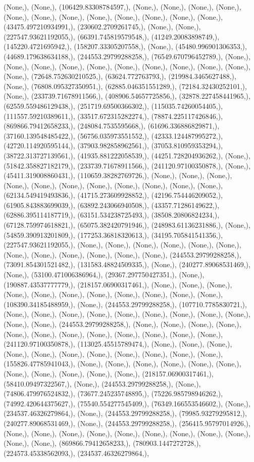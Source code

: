 \documentclass{article}
\begin{document}
(None,), (None,), (106429.83308784597,), (None,), (None,), (None,), (None,), (None,), (None,), (None,), (None,), (None,), (None,), (None,), (None,), (43475.497210934991,), (230602.2709261745,), (None,), (None,), (227547.93621192055,), (66391.745819579548,), (41249.20083898749,), (145220.4721695942,), (158207.33305207558,), (None,), (45480.996901306353,), (44689.179638634188,), (244553.29799288258,), (76549.670796452789,), (None,), (None,), (None,), (None,), (None,), (None,), (None,), (None,), (None,), (None,), (None,), (72648.752630210525,), (63624.772763793,), (219984.3465627488,), (None,), (76808.095327350951,), (62885.046351551289,), (72184.32430252101,), (None,), (233739.71678911566,), (408906.54657725856,), (32878.227458441965,), (62559.559486129438,), (251719.69500366302,), (115035.74260054405,), (111557.59210389611,), (33517.672315282274,), (78874.225117426846,), (869866.79412658233,), (248084.7535595668,), (61696.336886829871,), (37160.139548485422,), (56756.035973551552,), (42333.124487995272,), (42720.114920595144,), (37903.982858962561,), (37053.810959353294,), (38722.313727139561,), (41935.881222058539,), (44251.728204936262,), (None,), (51842.358827182179,), (233739.71678911566,), (241120.97100350878,), (None,), (45411.319008860431,), (110659.38282769726,), (None,), (None,), (None,), (None,), (None,), (None,), (None,), (None,), (None,), (None,), (None,), (62134.549419493836,), (41715.273609928852,), (42196.754446209052,), (61905.843883699039,), (63892.243066940508,), (43357.71286149622,), (62886.395114187719,), (63151.534238725493,), (38508.20806824234,), (67128.759974618821,), (65075.382420791946,), (248983.61136231886,), (None,), (54859.390913201809,), (177253.36818320613,), (34195.705841541356,), (227547.93621192055,), (None,), (None,), (None,), (None,), (None,), (None,), (None,), (None,), (None,), (None,), (None,), (None,), (244553.29799288258,), (73091.854301521482,), (131583.48824509335,), (None,), (240277.89068531469,), (None,), (53100.471006386964,), (29367.297750427351,), (None,), (190887.43537777779,), (218157.06900317461,), (None,), (None,), (None,), (None,), (None,), (None,), (None,), (None,), (None,), (None,), (None,), (108390.34185488959,), (None,), (244553.29799288258,), (107710.7785830721,), (None,), (None,), (None,), (None,), (None,), (None,), (None,), (None,), (None,), (None,), (None,), (244553.29799288258,), (None,), (None,), (None,), (None,), (None,), (None,), (None,), (None,), (None,), (None,), (None,), (None,), (241120.97100350878,), (113025.45515789474,), (None,), (None,), (None,), (None,), (None,), (None,), (None,), (None,), (None,), (None,), (None,), (155826.47785941043,), (None,), (None,), (None,), (None,), (None,), (None,), (None,), (None,), (None,), (None,), (None,), (218157.06900317461,), (58410.09497322567,), (None,), (244553.29799288258,), (None,), (74806.479976524832,), (73677.245235748895,), (75226.985798946262,), (74992.420644375627,), (75540.554277545409,), (76349.166553546602,), (None,), (234537.46326279864,), (None,), (244553.29799288258,), (79985.93279295812,), (240277.89068531469,), (None,), (244553.29799288258,), (256415.95797014926,), (None,), (None,), (None,), (None,), (None,), (None,), (None,), (None,), (None,), (None,), (None,), (869866.79412658233,), (780903.1447272728,), (224573.45338562093,), (234537.46326279864,), 
\end{document}
